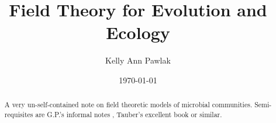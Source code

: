 \documentclass[aps,prx,groupedaddress,notitlepage]{revtex4-1} %
\begin{document}
	
	
	\title{Field Theory for Evolution and Ecology}
	
	
	\author{Kelly Ann Pawlak}
	
	
	\date{\today}
	
	\begin{abstract}
		A very un-self-contained note on field theoretic models of microbial communities. Semi-requisites are G.P.'s informal notes \cite{Gunnar}, Tauber's excellent book \cite{tauber2014critical} or similar.
	\end{abstract}
	
	\pacs{}
	
	\maketitle
	\tableofcontents
	\newpage
\end{document}
